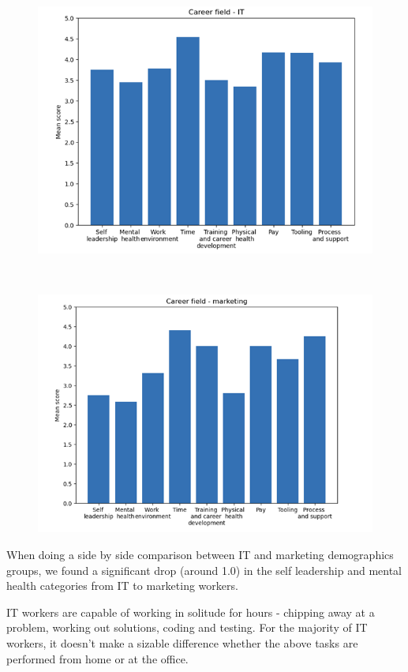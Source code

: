 \documentclass[12pt]{article}
\begin{document}
\begin{figure}[h]
    \centering
    \includegraphics[scale=1]{it.png}
    \label{kids}
\end{figure} \\

\begin{figure}[h]
    \centering
    \includegraphics[scale=1]{marketing.png}
    \label{marriage}
\end{figure} 

When doing a side by side comparison between IT and marketing demographics groups, we found a significant drop (around 1.0)  in the self leadership and mental health categories from IT to marketing workers. 

IT workers are capable of working in solitude for hours - chipping away at a problem, working out solutions, coding and testing. For the majority of IT workers, it doesn’t make a sizable difference whether the above tasks are performed from home or at the office. 
\end{document}
